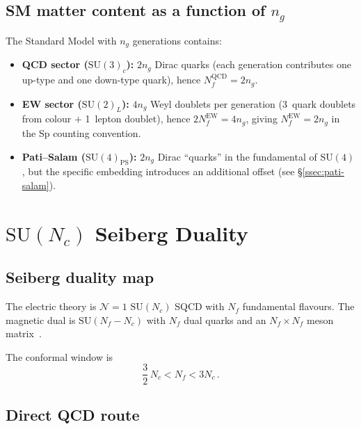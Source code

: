 \documentclass[11pt,a4paper]{article}
\theoremstyle{plain}
\theoremstyle{definition}
\theoremstyle{remark}
\newcommand{\Nc}{N_{\!c}}
\newcommand{\Nf}{N_{\!f}}
\newcommand{\ngen}{n_g}
\newcommand{\SU}[1]{\mathrm{SU}(#1)}
\begin{document}
\subsection{SM matter content as a function of $\ngen$}
\label{ssec:SM-matter}

The Standard Model with $\ngen$ generations contains:
\begin{itemize}
  \item \textbf{QCD sector ($\SU{3}_c$):} $2\ngen$ Dirac quarks
    (each generation contributes one up-type and one down-type quark),
    hence $\Nf^{\mathrm{QCD}} = 2\ngen$.
  \item \textbf{EW sector ($\SU{2}_L$):} $4\ngen$ Weyl doublets per
    generation (3~quark doublets from colour $+$ 1~lepton doublet),
    hence $2\Nf^{\mathrm{EW}} = 4\ngen$, giving
    $\Nf^{\mathrm{EW}} = 2\ngen$ in the Sp counting convention.
  \item \textbf{Pati--Salam ($\SU{4}_{\mathrm{PS}}$):}
    $2\ngen$ Dirac ``quarks'' in the fundamental of $\SU{4}$, but the
    specific embedding introduces an additional offset (see
    \S\ref{ssec:pati-salam}).
\end{itemize}


\section{$\SU{\Nc}$ Seiberg Duality}
\label{sec:SU-duality}

\subsection{Seiberg duality map}

The electric theory is $\mathcal{N}=1$ $\SU{\Nc}$ SQCD with $\Nf$
fundamental flavours.  The magnetic dual is $\SU{\Nf - \Nc}$ with $\Nf$
dual quarks and an $\Nf \times \Nf$ meson
matrix~\cite{Seiberg1995}.

The conformal window is
\begin{equation}\label{eq:SU-CW}
  \frac{3}{2}\,\Nc < \Nf < 3\Nc\,.
\end{equation}

\subsection{Direct QCD route}
\label{ssec:direct-QCD}
\end{document}
